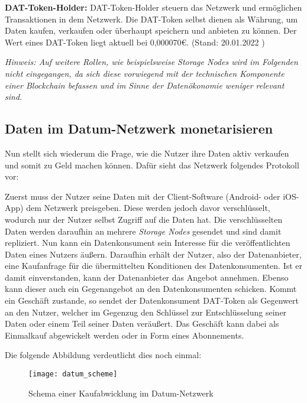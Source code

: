 \noindent \textbf{DAT-Token-Holder:} DAT-Token-Holder steuern das Netzwerk und ermöglichen Transaktionen in dem Netzwerk. Die DAT-Token selbst dienen als Währung, um Daten kaufen, verkaufen oder überhaupt speichern und anbieten zu können. Der Wert eines DAT-Token liegt aktuell bei 0,000070€. (Stand: 20.01.2022 \cite{DAT_Token_price}) \newline

\noindent \textit{Hinweis: Auf weitere Rollen, wie beispielsweise Storage Nodes wird im Folgenden nicht eingegangen, da sich diese vorwiegend mit der technischen Komponente einer Blockchain befassen und im Sinne der Datenökonomie weniger relevant sind.}

\subsection{Daten im Datum-Netzwerk monetarisieren}
Nun stellt sich wiederum die Frage, wie die Nutzer ihre Daten aktiv verkaufen und somit zu Geld machen können. Dafür sieht das Netzwerk folgendes Protokoll vor: \newline

\noindent Zuerst muss der Nutzer seine Daten mit der Client-Software (Android- oder iOS-App) dem Netzwerk preisgeben. Diese werden jedoch davor verschlüsselt, wodurch nur der Nutzer selbst Zugriff auf die Daten hat. Die verschlüsselten Daten werden daraufhin an mehrere \textit{Storage Nodes} gesendet und sind damit repliziert. Nun kann ein Datenkonsument sein Interesse für die veröffentlichten Daten eines Nutzers äußern. Daraufhin erhält der Nutzer, also der Datenanbieter, eine Kaufanfrage für die übermittelten Konditionen des Datenkonsumenten. Ist er damit einverstanden, kann der Datenanbieter das Angebot annehmen. Ebenso kann dieser auch ein Gegenangebot an den Datenkonsumenten schicken. Kommt ein Geschäft zustande, so sendet der Datenkonsument DAT-Token als Gegenwert an den Nutzer, welcher im Gegenzug den Schlüssel zur Entschlüsselung seiner Daten oder einem Teil seiner Daten veräußert.
Das Geschäft kann dabei als Einmalkauf abgewickelt werden oder in Form eines Abonnements. \cite{datum_2017} \newline

\noindent Die folgende Abbildung verdeutlicht dies noch einmal:

\begin{figure}[!ht]
	\centering
	\texttt{[image: datum\_scheme]}
	\caption{Schema einer Kaufabwicklung im Datum-Netzwerk \cite{datum_2017}}
	\label{fig:datumScheme}
\end{figure}
\FloatBarrier